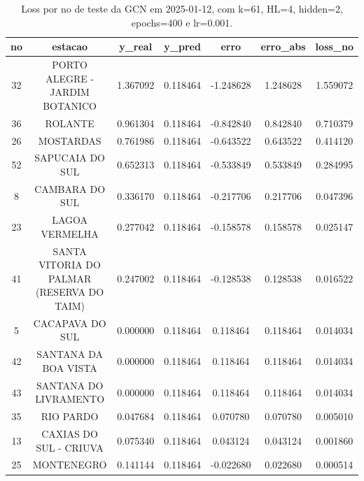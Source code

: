 \begin{table}[h]
\centering
\caption{Loss por no de teste da GCN em 2025-01-12, com k=61, HL=4, hidden=2, epochs=400 e lr=0.001.}
\label{tab:gcn_loss_k61_hl4_h2_e400_d20250112}
\begin{tabular}{ccccccc}
\toprule
no & estacao & y\_real & y\_pred & erro & erro\_abs & loss\_no \\
\midrule
32 & PORTO ALEGRE - JARDIM BOTANICO & 1.367092 & 0.118464 & -1.248628 & 1.248628 & 1.559072 \\
36 & ROLANTE & 0.961304 & 0.118464 & -0.842840 & 0.842840 & 0.710379 \\
26 & MOSTARDAS & 0.761986 & 0.118464 & -0.643522 & 0.643522 & 0.414120 \\
52 & SAPUCAIA DO SUL & 0.652313 & 0.118464 & -0.533849 & 0.533849 & 0.284995 \\
8 & CAMBARA DO SUL & 0.336170 & 0.118464 & -0.217706 & 0.217706 & 0.047396 \\
23 & LAGOA VERMELHA & 0.277042 & 0.118464 & -0.158578 & 0.158578 & 0.025147 \\
41 & SANTA VITORIA DO PALMAR (RESERVA DO TAIM) & 0.247002 & 0.118464 & -0.128538 & 0.128538 & 0.016522 \\
5 & CACAPAVA DO SUL & 0.000000 & 0.118464 & 0.118464 & 0.118464 & 0.014034 \\
42 & SANTANA DA BOA VISTA & 0.000000 & 0.118464 & 0.118464 & 0.118464 & 0.014034 \\
43 & SANTANA DO LIVRAMENTO & 0.000000 & 0.118464 & 0.118464 & 0.118464 & 0.014034 \\
35 & RIO PARDO & 0.047684 & 0.118464 & 0.070780 & 0.070780 & 0.005010 \\
13 & CAXIAS DO SUL - CRIUVA & 0.075340 & 0.118464 & 0.043124 & 0.043124 & 0.001860 \\
25 & MONTENEGRO & 0.141144 & 0.118464 & -0.022680 & 0.022680 & 0.000514 \\
\bottomrule
\end{tabular}
\end{table}
